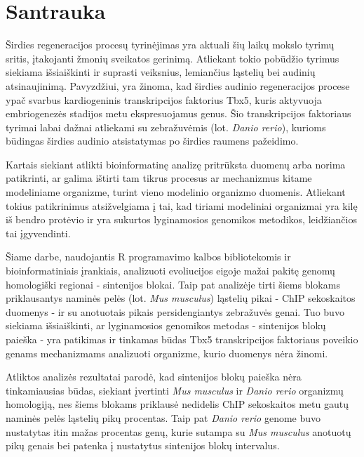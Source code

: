 \documentclass[12pt]{article}
\begin{document}

\section*{Santrauka}
Širdies regeneracijos procesų tyrinėjimas yra aktuali šių laikų mokslo tyrimų
sritis, įtakojanti žmonių sveikatos gerinimą. Atliekant tokio pobūdžio
tyrimus siekiama išsiaiškinti ir suprasti veiksnius, lemiančius ląstelių bei
audinių atsinaujinimą. Pavyzdžiui, yra žinoma, kad širdies audinio regeneracijos
procese ypač svarbus kardiogeninis transkripcijos faktorius Tbx5, kuris
aktyvuoja embriogenezės stadijos metu ekspresuojamus genus. Šio transkripcijos
faktoriaus tyrimai labai dažnai atliekami su zebražuvėmis (lot.
\emph{Danio rerio}), kurioms būdingas širdies audinio atsistatymas po širdies
raumens pažeidimo.

Kartais siekiant atlikti bioinformatinę analizę pritrūksta duomenų arba norima
patikrinti, ar galima ištirti tam tikrus procesus ar mechanizmus kitame
modeliniame organizme, turint vieno modelinio organizmo duomenis. Atliekant
tokius patikrinimus atsižvelgiama į tai, kad tiriami modeliniai organizmai yra
kilę iš bendro protėvio ir yra sukurtos lyginamosios genomikos metodikos,
leidžiančios tai įgyvendinti.

Šiame darbe, naudojantis R programavimo kalbos bibliotekomis ir
bioinformatiniais įrankiais, analizuoti evoliucijos eigoje mažai pakitę genomų
homologiški regionai - sintenijos blokai. Taip pat analizėje tirti šiems blokams
priklausantys naminės pelės (lot. \emph{Mus musculus}) ląstelių pikai - ChIP
sekoskaitos duomenys - ir su anotuotais pikais persidengiantys zebražuvės genai.
Tuo buvo siekiama išsiaiškinti, ar lyginamosios genomikos metodas - sintenijos
blokų paieška - yra patikimas ir tinkamas būdas Tbx5 transkripcijos faktoriaus
poveikio genams mechanizmams analizuoti organizme, kurio duomenys nėra žinomi.

Atliktos analizės rezultatai parodė, kad sintenijos blokų paieška nėra
tinkamiausias būdas, siekiant įvertinti \emph{Mus musculus} ir
\emph{Danio rerio} organizmų homologiją, nes šiems blokams priklausė nedidelis
ChIP sekoskaitos metu gautų naminės pelės ląstelių pikų procentas. Taip pat
\emph{Danio rerio} genome buvo nustatytas itin mažas procentas genų, kurie
sutampa su \emph{Mus musculus} anotuotų pikų genais bei patenka į nustatytus
sintenijos blokų intervalus.
\end{document}
